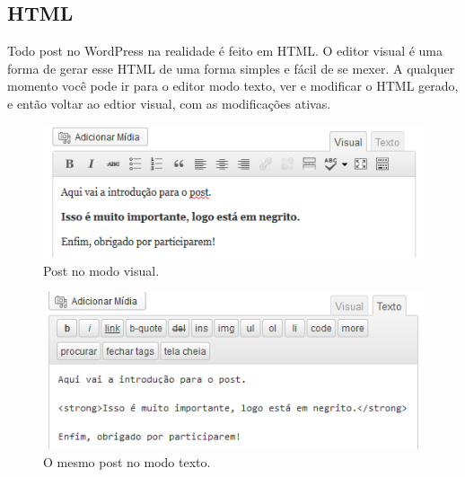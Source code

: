 \documentclass[12pt,onecolumn]{article}
\begin{document}
	\subsection{HTML}
		Todo post no WordPress na realidade é feito em HTML. O editor visual é uma
		forma de gerar esse HTML de uma forma simples e fácil de se mexer. A qualquer 
		momento você pode ir para o editor modo texto, ver e modificar o HTML gerado, 
		e então voltar ao edtior visual, com as modificações ativas.
		\begin{figure}[H]
			\centering
			\includegraphics{html2.png}
			\caption{Post no modo visual.}
		\end{figure}
		\begin{figure}[H]
			\centering
			\includegraphics{html3.png}
			\caption{O mesmo post no modo texto.}
		\end{figure}
\end{document}
